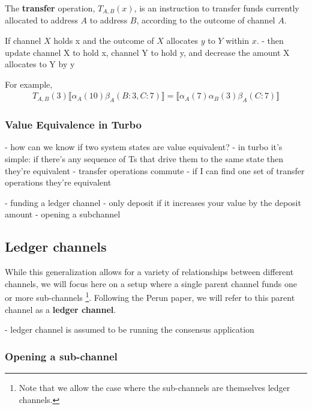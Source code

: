 \documentclass{article}
\theoremstyle{definition}
\newcommand{\adj}[1]{\llbracket #1 \rrbracket}
\begin{document}
The \textbf{transfer} operation, $T_{A,B}(x)$, is an instruction to transfer funds currently allocated
to address $A$ to address $B$, according to the outcome of channel $A$.



If channel $X$ holds x and the outcome of $X$ allocates $y$ to $Y$ within $x$.
- then update channel X to hold x, channel Y to hold y, and decrease the amount X allocates to Y by y

For example, 
\begin{align*}
T_{A,B}(3) \adj{\alpha_A(10)\beta_A(B: 3, C: 7)} = \adj{\alpha_A(7)\alpha_B(3)\beta_A(C: 7)}
\end{align*}

\subsubsection{Value Equivalence in Turbo}

- how can we know if two system states are value equivalent?
- in turbo it's simple: if there's any sequence of Ts that drive them to the same state
  then they're equivalent
- transfer operations commute
- if I can find one set of transfer operations they're equivalent

- funding a ledger channel - only deposit if it increases your value by the deposit amount
- opening a subchannel

\subsection{Ledger channels}

While this generalization allows for a variety of relationships between different channels,
we will focus here on a setup where a single parent channel funds one or more sub-channels
\footnote{Note that we allow the case where the sub-channels are themselves ledger channels.}.
Following the Perun paper, we will refer to this parent channel as a \textbf{ledger channel}.

- ledger channel is assumed to be running the consensus application

\subsubsection{Opening a sub-channel}
\end{document}
